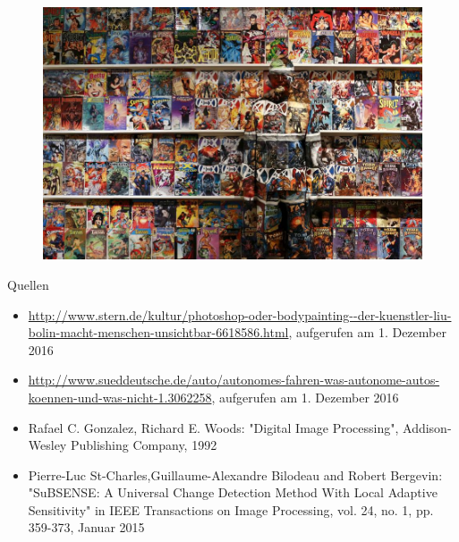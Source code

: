 \documentclass[hyperref={pdfpagelabels=false}]{beamer}
\begin{document}
\begin{frame}
	\begin{figure}[]
		\centering
		\includegraphics[width=0.98\linewidth]{bilder/einstieg.jpg}
		\label{fig:einstieg}
	\end{figure}

\end{frame}


\begin{frame}[t]{Quellen}
	\begin{itemize}
		\item \url{http://www.stern.de/kultur/photoshop-oder-bodypainting--der-kuenstler-liu-bolin-macht-menschen-unsichtbar-6618586.html}, aufgerufen am 1. Dezember 2016
		\item \url{http://www.sueddeutsche.de/auto/autonomes-fahren-was-autonome-autos-koennen-und-was-nicht-1.3062258}, aufgerufen am 1. Dezember 2016
		\item Rafael C. Gonzalez, Richard E. Woods: "Digital Image Processing", Addison-Wesley Publishing Company, 1992
		\item Pierre-Luc St-Charles,Guillaume-Alexandre Bilodeau and Robert Bergevin: "SuBSENSE: A Universal Change Detection Method With Local Adaptive Sensitivity" in IEEE Transactions on Image Processing, vol. 24, no. 1, pp. 359-373, Januar 2015
	\end{itemize}
\end{frame}
\end{document}
